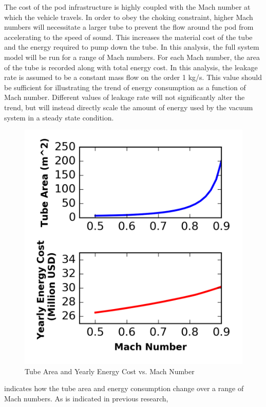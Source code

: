The cost of the pod infrastructure is highly coupled with the
Mach number at which the vehicle travels. In order to obey the choking constraint,
higher Mach numbers will necessitate a larger tube to prevent the flow around
the pod from accelerating to the speed of sound. This increases the material
cost of the tube and the energy required to pump down the tube. In this analysis,
the full system model will be run for a range of Mach numbers.
For each Mach number, the area of the tube is recorded along with total energy cost.
In this analysis, the leakage rate is assumed to be a constant mass flow on the order 1 kg/s.
This value should be sufficient for illustrating the trend of energy
consumption as a function of Mach number. Different values of leakage rate will
not significantly alter the trend, but will instead directly scale the amount
of energy used by the vacuum system in a steady state condition.
\begin{figure}
	\centering
	\includegraphics{../../images/graphs/mach_trades/pressure_vs_mach.png}
	\caption{Tube Area and Yearly Energy Cost vs. Mach Number}
	\label{fig:tube_area_cost_vs_mach}
\end{figure}
 indicates how the tube area and energy
consumption change over a range of Mach numbers. As is indicated in previous research,
